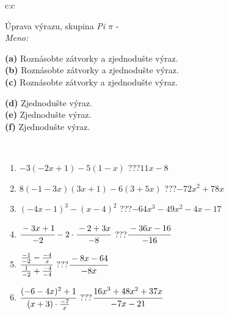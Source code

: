 \documentclass[10pt]{report}
\begin{document}
\newpage
\thispagestyle{empty}
\begin{tabular}{c:c}
\begin{minipage}[c][104.5mm][t]{0.5\linewidth}
\begin{center}
\vspace{7mm}
{\huge Úprava výrazu, skupina \textit{Pi $\pi$} -}\\[5mm]
\textit{Meno:}\phantom{xxxxxxxxxxxxxxxxxxxxxxxxxxxxxxxxxxxxxxxxxxxxxxxxxxxxxxxxxxxxxxxxx}\\[5mm]
\begin{minipage}{0.95\linewidth}
\begin{center}
{\small \begin{minipage}{0.6\textwidth}
\textbf{(a)} Roznásobte zátvorky a zjednodušte výraz. \\[1mm]
\textbf{(b)} Roznásobte zátvorky a zjednodušte výraz. \\[1mm]
\textbf{(c)} Roznásobte zátvorky a zjednodušte výraz.
\end{minipage} \begin{minipage}{0.39\textwidth}
\textbf{(d)} Zjednodušte výraz. \\[1mm]
\textbf{(e)} Zjednodušte výraz. \\[1mm]
\textbf{(f)} Zjednodušte výraz.
\end{minipage}
}
\end{center}
\end{minipage}
\\[4mm]
\begin{minipage}{0.79\linewidth}
\begin{center}
\begin{varwidth}{\linewidth}
\begin{enumerate}
\normalsize
\item $-3(-2x+1)-5(1-x)$\quad \dotfill\; ???\;\dotfill \quad $11x-8$
\item $8(-1-3x)(3x+1)-6(3+5x)$\quad \dotfill\; ???\;\dotfill \quad $-72x^2+78x$
\item $(-4x-1)^3-(x-4)^2$\quad \dotfill\; ???\;\dotfill \quad $-64x^3-49x^2-4x-17$
\item $\cfrac{-3x+1}{-2}-2\cdot\cfrac{-2+3x}{-8}$\quad \dotfill\; ???\;\dotfill \quad $\cfrac{-36x-16}{-16}$
\item $\cfrac{\frac{-1}{-2}-\frac{-4}{x}}{\frac{1}{-2}+\frac{-4}{-4}}$\quad \dotfill\; ???\;\dotfill \quad $\cfrac{-8x-64}{-8x}$
\item $\cfrac{(-6-4x)^2+1}{(x+3)\cdot\frac{-7}{x}}$\quad \dotfill\; ???\;\dotfill \quad $\cfrac{16x^3+48x^2+37x}{-7x-21}$

\end{enumerate}
\end{varwidth}
\end{center}
\end{minipage}
\end{center}
\end{minipage}
\end{tabular}
\end{document}

